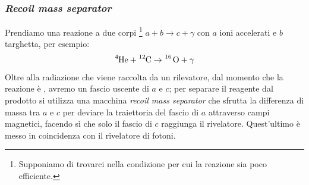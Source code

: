 \subsubsection{\textit{Recoil mass separator}}
Prendiamo una reazione a due corpi \footnote{Supponiamo di trovarci nella condizione per cui la reazione sia poco efficiente.} $a+b \to c+\gamma$ con $a$ ioni accelerati e $b$ targhetta, per esempio:
$$\ce{^4He} + \ce{^{12}C}\to \ce{^{16} O}+\gamma$$
Oltre alla radiazione che viene raccolta da un rilevatore, dal momento che la reazione è , avremo un fascio uscente di $a$ e $c$; per separare il reagente dal prodotto si utilizza una macchina \textit{recoil mass separator} che sfrutta la differenza di massa tra $a$ e $c$ per deviare la traiettoria del fascio di $a$ attraverso campi magnetici, facendo sì che solo il fascio di $c$ raggiunga il rivelatore. Quest'ultimo è messo in coincidenza con il rivelatore di fotoni.

